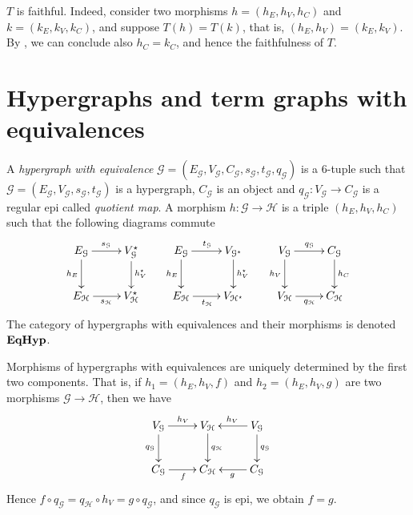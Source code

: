 {\begin{remark}
	$T$ is faithful. Indeed, consider two morphisms $h = (h_E, h_V, h_C)$ and $k = (k_E, k_V, k_C)$, and suppose $T(h) = T(k)$, that is, $(h_E, h_V) = (k_E, k_V)$.
	By , we can conclude also $h_C = k_C$, and hence the faithfulness of $T$.
\end{remark}
}

\section{Hypergraphs and term graphs with equivalences}


\begin{definition}
	A \emph{hypergraph with equivalence} $\mathcal{G} = (E_\mathcal{G}, V_{\mathcal{G}}, C_\mathcal{G}, s_\mathcal{G}, t_\mathcal{G}, q_\mathcal{G})$ is a 6-tuple such that $\mathcal{G} = (E_\mathcal{G}, V_{\mathcal{G}}, s_\mathcal{G}, t_\mathcal{G})$ is a hypergraph, $C_\mathcal{G}$ is an object and $q_{\mathcal{G}}: V_{\mathcal{G}}\to C_{\mathcal{G}}$ is a regular epi called \emph{quotient map}. 
	A morphism $h:\mathcal{G\to H}$ is a triple $(h_E, h_V, h_C)$ such that the following diagrams commute
	\[\xymatrix{
		{E_\mathcal{G}}\ar[r]^{s_\mathcal{G}}\ar[d]_{h_E} & {V_{\mathcal{G}}^\star}\ar[d]^{h_V^\star} & {E_\mathcal{G}}\ar[r]^{t_\mathcal{G}}\ar[d]_{h_E} & {V_{\mathcal{G}^\star}}\ar[d]^{h_V^\star} & {V_\mathcal{G}}\ar[r]^{q_\mathcal{G}}\ar[d]_{h_V} & {C_{\mathcal{G}}} \ar[d]^{h_C} \\
		{E_\mathcal{H}}\ar[r]_{s_\mathcal{H}} & {V_{\mathcal{H}}^\star}	& {E_\mathcal{H}}\ar[r]_{t_\mathcal{H}} & {V_{\mathcal{H}^\star}}& {V_\mathcal{H}}\ar[r]_{q_\mathcal{H}} & {C_\mathcal{H}}
	}\]
	The category of hypergraphs with equivalences and their morphisms is denoted $\textbf{\textup{EqHyp}}$.

\end{definition}

\begin{remark}\label{rem:eqhyp_morphs}
	Morphisms of hypergraphs with equivalences are uniquely determined by the first two components. That is, if $h_1 = (h_E, h_V, f)$ and $h_2 = (h_E, h_V, g)$ are two morphisms $\mathcal{G \to H}$, then we have
	\[\xymatrix{
			{V_\mathcal{G}} \ar[r]^{h_V}\ar[d]_{q_\mathcal{G}} & V_\mathcal{H} \ar[d]^{q_\mathcal{H}} & V_\mathcal{G}\ar[l]_{h_V}\ar[d]^{q_\mathcal{G}}\\
			C_{\mathcal{G}}\ar[r]_{f} & C_{\mathcal{H}} & C_{\mathcal{G}}\ar[l]^{g}
	}\]
	Hence $f \circ q_\mathcal{G} = q_\mathcal{H}\circ h_V =g\circ q_\mathcal{G}$, and since $q_\mathcal{G}$ is epi, we obtain $f = g$.
\end{remark}

